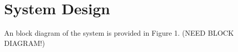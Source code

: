\section{System Design}

An block diagram of the system is provided in Figure 1. (NEED BLOCK DIAGRAM!)
